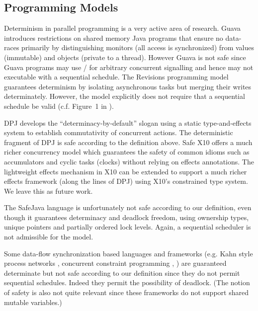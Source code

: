 \label{sec:related}

\subsection{Programming Models}
Determinism in parallel programming is a very active area of research.
Guava \cite{guava} introduces restrictions on shared memory Java
programs that ensure no data-races primarily by distinguishing
monitors (all access is synchronized) from values (immutable) and
objects (private to a thread). However Guava is not safe since Guava
programs may use / for arbitrary concurrent
signalling and hence may not executable with a sequential
schedule. The Revisions programming model \cite{Revisions} guarantees
determinism by isolating asynchronous tasks but merging their writes
determinately. However, the model explicitly does not require that
a sequential schedule be valid (c.f. Figure~1 in \cite{Revisions}).


DPJ develops the ``determinacy-by-default'' slogan using a static
type-and-effects system to establish commutativity of concurrent
actions.  The deterministic fragment of DPJ is safe according to the
definition above. Safe X10 offers a much richer concurrency model
which guarantees the safety of common idioms such as accumulators and
cyclic tasks (clocks) without relying on effects annotations. The
lightweight effects mechanism in X10 can be extended to support a much
richer effects framework (along the lines of DPJ) using X10's
constrained type system.  We leave this as future work.

The SafeJava language \cite{Rinard04safejava:a} is unfortunately not safe
according to our definition, even though it guarantees determinacy and
deadlock freedom, using ownership types, unique pointers and partially
ordered lock levels. Again, a sequential scheduler is not admissible
for the model.

Some data-flow synchronization based languages and frameworks (e.g.{}
Kahn style process networks \cite{kahn1974semantics}, concurrent
constraint programming \cite{saraswat1993concurrent}, \cite{SHIM}) are guaranteed
determinate but not safe according to our definition since they do not
permit sequential schedules. Indeed they permit the possibility of
deadlock. (The notion of safety is also not quite relevant since these
frameworks do not support shared mutable variables.)

